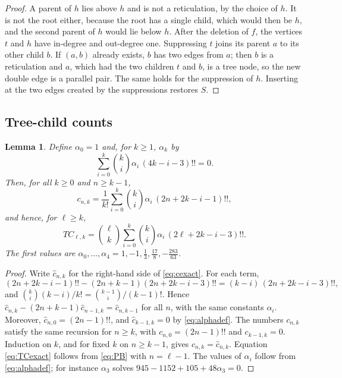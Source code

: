 \documentclass[11pt,a4paper]{article}
\newtheorem{lemma}[theorem]{Lemma}
\theoremstyle{definition}
\begin{document}
\begin{proof}
A parent of $h$ lies above $h$ and is not a reticulation, by the choice of $h$. It is not the root either, because the root has a single child, which would then be $h$, and the second parent of $h$ would lie below $h$. After the deletion of $f$, the vertices $t$ and $h$ have in-degree and out-degree one. Suppressing $t$ joins its parent $a$ to its other child $b$. If $(a,b)$ already exists, $b$ has two edges from $a$; then $b$ is a reticulation and $a$, which had the two children $t$ and $b$, is a tree node, so the new double edge is a parallel pair. The same holds for the suppression of $h$. Inserting at the two edges created by the suppressions restores $S$.
\end{proof}



\subsection{Tree-child counts}

\begin{lemma}\label{lem:exactTC}
Define $\alpha_0=1$ and, for $k\ge1$, $\alpha_k$ by
\begin{equation}\label{eq:alphadef}
\sum_{i=0}^{k}\binom{k}{i}\alpha_i\,(4k-i-3)!!=0 .
\end{equation}
Then, for all $k\ge0$ and $n\ge k-1$,
\begin{equation}\label{eq:cexact}
c_{n,k}=\frac{1}{k!}\sum_{i=0}^{k}\binom{k}{i}\alpha_i\,(2n+2k-i-1)!!,
\end{equation}
and hence, for $\ell\ge k$,
\begin{equation}\label{eq:TCexact}
TC_{\ell,k}=\binom{\ell}{k}\sum_{i=0}^{k}\binom{k}{i}\alpha_i\,(2\ell+2k-i-3)!! .
\end{equation}
The first values are $\alpha_0,\dots,\alpha_4=1,-1,\frac13,\frac{17}{8},-\frac{283}{63}$.
\end{lemma}

\begin{proof}
Write $\hat c_{n,k}$ for the right-hand side of \eqref{eq:cexact}. For each term,
\[
(2n+2k-i-1)!!-(2n+k-1)(2n+2k-i-3)!!=(k-i)\,(2n+2k-i-3)!!,
\]
and $\binom{k}{i}(k-i)/k!=\binom{k-1}{i}/(k-1)!$. Hence $\hat c_{n,k}-(2n+k-1)\hat c_{n-1,k}=\hat c_{n,k-1}$ for all $n$, with the same constants $\alpha_i$. Moreover, $\hat c_{n,0}=(2n-1)!!$, and $\hat c_{k-1,k}=0$ by \eqref{eq:alphadef}. The numbers $c_{n,k}$ satisfy the same recursion for $n\ge k$, with $c_{n,0}=(2n-1)!!$ and $c_{k-1,k}=0$. Induction on $k$, and for fixed $k$ on $n\ge k-1$, gives $c_{n,k}=\hat c_{n,k}$. Equation \eqref{eq:TCexact} follows from \eqref{eq:PB} with $n=\ell-1$. The values of $\alpha_i$ follow from \eqref{eq:alphadef}; for instance $\alpha_3$ solves $945-1152+105+48\alpha_3=0$.
\end{proof}
\end{document}
